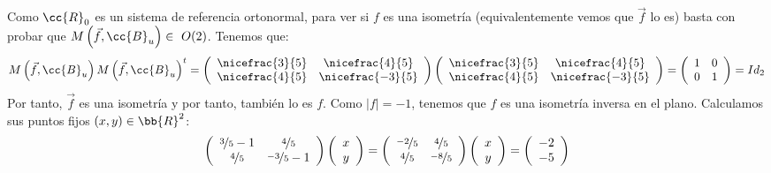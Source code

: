 \begin{ejercicio}
\begin{enumerate}
        Como $\cc{R}_0$ es un sistema de referencia ortonormal, para ver si $f$ es una isometría (equivalentemente vemos que $\vec{f}$ lo es) basta con probar que $M\left(\vec{f}, \cc{B}_u\right)\in~O(2)$. Tenemos que:
        \begin{equation*}
            M\left(\vec{f},\cc{B}_u\right)M\left(\vec{f},\cc{B}_u\right)^t
            = 
            \left(
            \begin{array}{cc}
                \nicefrac{3}{5} & \nicefrac{4}{5} \\
                \nicefrac{4}{5} & \nicefrac{-3}{5} 
            \end{array}
            \right)
            \left(
            \begin{array}{cc}
                \nicefrac{3}{5} & \nicefrac{4}{5} \\
                \nicefrac{4}{5} & \nicefrac{-3}{5}
            \end{array}
            \right)
            = 
            \left(
            \begin{array}{cc}
                1 & 0 \\
                0 & 1 \\
            \end{array}
            \right) = Id_2
        \end{equation*}
        Por tanto, $\vec{f}$ es una isometría y por tanto, también lo es $f$. Como $|f|=-1$, tenemos que $f$ es una isometría inversa en el plano. Calculamos sus puntos fijos $(x,y)\in \bb{R}^2$:
        \begin{equation*}
            \left(
            \begin{array}{cc}
                \nicefrac{3}{5}-1 & \nicefrac{4}{5} \\
                \nicefrac{4}{5} & \nicefrac{-3}{5}-1
            \end{array}
            \right)
            \left(
            \begin{array}{c}
                x\\y
            \end{array}
            \right)
            =\left(
            \begin{array}{cc}
                \nicefrac{-2}{5} & \nicefrac{4}{5} \\
                \nicefrac{4}{5} & \nicefrac{-8}{5}
            \end{array}
            \right)
            \left(
            \begin{array}{c}
                x\\y
            \end{array}
            \right)
            = \left(
            \begin{array}{c}
                -2\\-5
            \end{array}
            \right)
        \end{equation*}


\end{enumerate}
\end{ejercicio}
